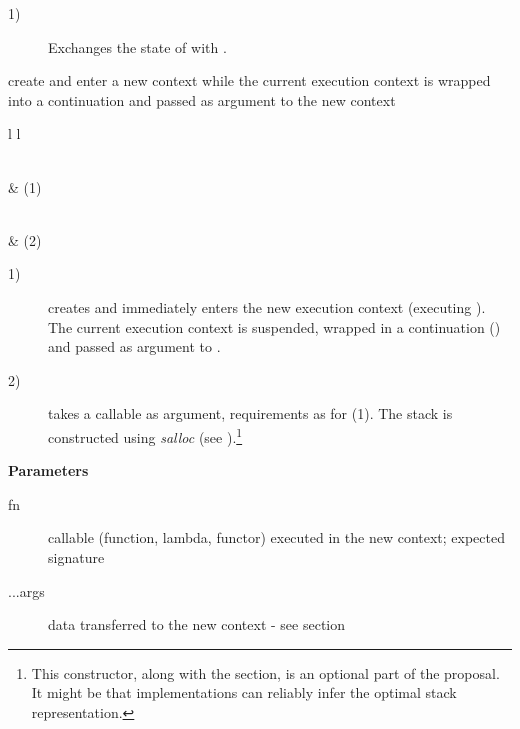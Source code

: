 \begin{description}
    \item[1)] Exchanges the state of  with .\\
\end{description}



create and enter a new context while the current execution context is wrapped
into a continuation and passed as argument to the new context\\

\begin{tabular}{ l l }
    \midrule

    \\
     & (1)\\

    \midrule

    \\
     & (2)\\

    \midrule
\end{tabular}

\begin{description}
    \item[1)] creates and immediately enters the new execution context
              (executing ). The current execution context is suspended,
              wrapped in a continuation (\cont) and passed as argument to
              .
    \item[2)] takes a callable as argument, requirements as for (1). The stack
              is constructed using \emph{salloc}
              (see ).\footnote{This constructor, along with
              the  section, is an optional part of the
              proposal. It might be that implementations can reliably infer the
              optimal stack representation.}
\end{description}

{\bfseries Parameters}
\begin{description}
    \item[fn]      callable (function, lambda, functor) executed in the new
                   context; expected signature  
    \item[...args] data transferred to the new context - see section
                   \\
\end{description}


